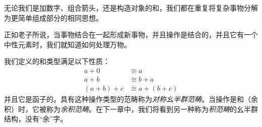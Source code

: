\documentclass[DaoFP]{subfiles}
\begin{document}
无论我们是加数字、组合箭头，还是构造对象的和，我们都在重复将复杂事物分解为更简单组成部分的相同思想。

正如老子所说，当事物结合在一起形成新事物，并且操作是结合的，并且它有一个中性元素时，我们就知道如何处理万物。

我们定义的和类型满足以下性质：
\begin{align*}
a + 0 &\cong a \\
a + b &\cong b + a \\
(a + b) + c &\cong a + (b + c)
\end{align*}
并且它是函子的。具有这种操作类型的范畴称为\emph{对称幺半群范畴}。当操作是和（余积）时，它被称为\emph{余积范畴}。在下一章中，我们将看到另一种称为\emph{积范畴}的幺半群结构，没有“余”字。
\end{document}
